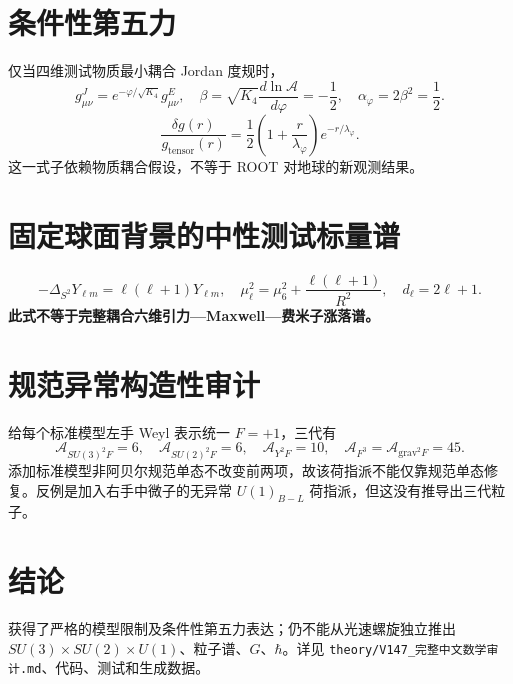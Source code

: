 \documentclass[11pt]{ctexart}
\begin{document}
\section{条件性第五力}
仅当四维测试物质最小耦合 Jordan 度规时，
\begin{equation}
 g^J_{\mu\nu}=e^{-\varphi/\sqrt{K_4}}g^E_{\mu\nu},\quad
 \beta=\sqrt{K_4}\frac{d\ln\mathcal A}{d\varphi}=-\frac12,\quad
 \alpha_\varphi=2\beta^2=\frac12.
\end{equation}
\begin{equation}
 \frac{\delta g(r)}{g_{\mathrm{tensor}}(r)}=
 \frac12\left(1+\frac{r}{\lambda_\varphi}\right)e^{-r/\lambda_\varphi}.
\end{equation}
这一式子依赖物质耦合假设，不等于 ROOT 对地球的新观测结果。
\section{固定球面背景的中性测试标量谱}
\begin{equation}
 -\Delta_{S^2}Y_{\ell m}=\ell(\ell+1)Y_{\ell m},\quad
 \mu_\ell^2=\mu_6^2+\frac{\ell(\ell+1)}{R^2},\quad d_\ell=2\ell+1.
\end{equation}
\textbf{此式不等于完整耦合六维引力—Maxwell—费米子涨落谱。}
\section{规范异常构造性审计}
给每个标准模型左手 Weyl 表示统一 $F=+1$，三代有
\begin{equation}
 \mathcal A_{SU(3)^2F}=6,\quad \mathcal A_{SU(2)^2F}=6,\quad
 \mathcal A_{Y^2F}=10,\quad \mathcal A_{F^3}=\mathcal A_{\mathrm{grav}^2F}=45.
\end{equation}
添加标准模型非阿贝尔规范单态不改变前两项，故该荷指派不能仅靠规范单态修复。反例是加入右手中微子的无异常 $U(1)_{B-L}$ 荷指派，但这没有推导出三代粒子。
\section{结论}
获得了严格的模型限制及条件性第五力表达；仍不能从光速螺旋独立推出 $SU(3)\times SU(2)\times U(1)$、粒子谱、$G$、$\hbar$。详见 \texttt{theory/V147\_完整中文数学审计.md}、代码、测试和生成数据。
\end{document}
